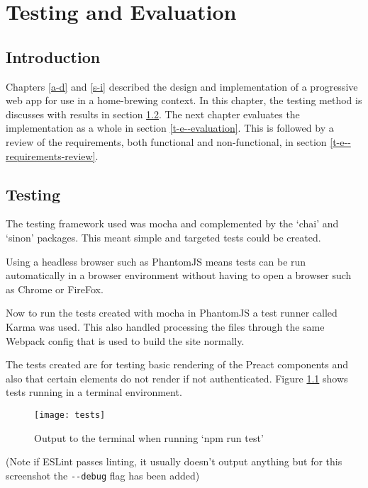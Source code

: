 \chapter{Testing and Evaluation} \label{t-e}

\section{Introduction} \label{t-e--introduction}

Chapters \ref{a-d} and \ref{s-i} described the design and implementation of a progressive web app for use in a home-brewing context. In this chapter, the testing method is discusses with results in section \ref{t-e--testing}. The next chapter evaluates the implementation as a whole in section \ref{t-e--evaluation}. This is followed by a review of the requirements, both functional and non-functional, in section \ref{t-e--requirements-review}.

\section{Testing} \label{t-e--testing}

The testing framework used was mocha and complemented by the `chai' and `sinon' packages. This meant simple and targeted tests could be created. \cite{mocha}

Using a headless browser such as PhantomJS means tests can be run automatically in a browser environment without having to open a browser such as Chrome or FireFox. \cite{phantomjs}

Now to run the tests created with mocha in PhantomJS a test runner called Karma was used. \cite{karma} This also handled processing the files through the same Webpack config that is used to build the site normally.

The tests created are for testing basic rendering of the Preact components and also that certain elements do not render if not authenticated. Figure \ref{figure-tests} shows tests running in a terminal environment.

\begin{figure}[H]
  \centering
    \texttt{[image: tests]}
  \caption{Output to the terminal when running `npm run test'}
  \label{figure-tests}
\end{figure}

(Note if ESLint passes linting, it usually doesn't output anything but for this screenshot the \verb|--debug| flag has been added)

